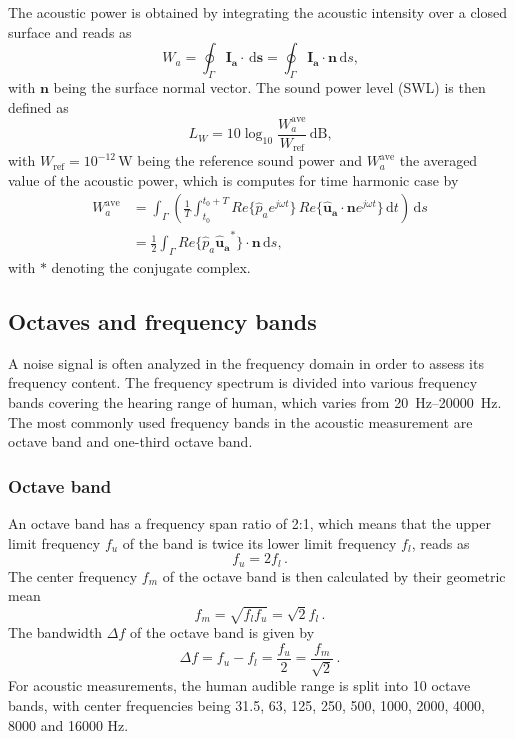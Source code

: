 The acoustic power is obtained by integrating the acoustic intensity over a closed surface and reads as
\begin{equation}
	W_a = \oint_{\Gamma} \boldsymbol{I_a}\cdot\,\text{d}\boldsymbol{s} = \oint_{\Gamma} \boldsymbol{I_a}\cdot\boldsymbol{n}\,\text{d}s \text{,}
\end{equation}
with $\boldsymbol{n}$ being the surface normal vector. The sound power level (SWL) is then defined as
\begin{equation}
	L_W = 10\log_{10}\frac{W_a^{\text{ave}}}{W_\text{ref}}\,\text{dB}\text{,}
\end{equation}
with $W_\text{ref} = 10^{-12}\,\text{W}$ being the reference sound power and $W_a^{\text{ave}}$ the averaged value of the acoustic power, which is computes for time harmonic case by
\begin{align}
	W_a^{\text{ave}} &= \int_{\Gamma}\left(\frac{1}{T} \int_{t_0}^{t_0 + T} Re\lbrace\hat{p}_a e^{j\omega t}\rbrace\,Re\lbrace\boldsymbol{\hat{u}_a} \cdot \boldsymbol{n} e^{j\omega t}\rbrace \, \text{d}t  \right)\,\text{d}s \\
	&= \frac{1}{2} \int_{\Gamma} Re\lbrace\hat{p}_a \boldsymbol{\hat{u}_a}^*\rbrace \cdot \boldsymbol{n}\,\text{d}s \text{,}
\end{align}
with $*$ denoting the conjugate complex.

\newpage
\subsection{Octaves and frequency bands}

A noise signal is often analyzed in the frequency domain in order to assess its frequency content. The frequency spectrum is divided into various frequency bands covering the hearing range of human, which varies from \SIrange{20}{20000}{\hertz}. The most commonly used frequency bands in the acoustic measurement are octave band and one-third octave band.

\subsubsection*{Octave band}
An octave band has a frequency span ratio of 2:1, which means that the upper limit frequency $f_u$ of the band is twice its lower limit frequency $f_l$, reads as
\begin{equation}
	f_u = 2f_l\,.
\end{equation}
The center frequency $f_m$ of the octave band is then calculated by their geometric mean
\begin{equation}
	f_m = \sqrt{f_l f_u} = \sqrt{2}f_l\,.
\end{equation}
The bandwidth $\Delta f$ of the octave band is given by
\begin{equation}
	\Delta f = f_u - f_l = \frac{f_u}{2} = \frac{f_m}{\sqrt{2}}\,.
\end{equation}
For acoustic measurements, the human audible range is split into 10 octave bands, with center frequencies being 31.5, 63, 125, 250, 500, 1000, 2000, 4000, 8000 and 16000 Hz.

